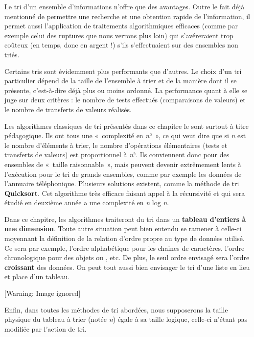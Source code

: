 {
Le tri d’un ensemble d’informations n’offre que des avantages. Outre le
fait déjà mentionné de permettre une recherche et une obtention rapide
de l’information, il permet aussi l’application de traitements
algorithmiques efficaces (comme par exemple celui des ruptures que nous
verrons plus loin) qui s’avéreraient trop coûteux (en temps, donc en
argent !) s’ils s’effectuaient sur des ensembles non triés.}

{
Certains tris sont évidemment plus performants que d’autres. Le choix
d’un tri particulier dépend de la taille de l’ensemble à trier et de la
manière dont il se présente, c’est-à-dire déjà plus ou moins ordonné.
La performance quant à elle se juge sur deux critères : le nombre de
tests effectués (comparaisons de valeurs) et le nombre de transferts de
valeurs réalisés. }

{
Les algorithmes classiques de tri présentés dans ce chapitre le sont
surtout à titre pédagogique. Ils ont tous une «~complexité en
\textit{n}²~», ce qui veut dire que si \textit{n} est le nombre
d’éléments à trier, le nombre d’opérations élémentaires (tests et
transferts de valeurs) est proportionnel à \textit{n}². Ils conviennent
donc pour des ensembles de «~taille raisonnable~», mais peuvent devenir
extrêmement lents à l’exécution pour le tri de grands ensembles, comme
par exemple les données de l’annuaire téléphonique. Plusieurs solutions
existent, comme la méthode de tri \textbf{Quicksort}. Cet algorithme
très efficace faisant appel à la récursivité et qui sera étudié en
deuxième année a une complexité en \textit{n} log \textit{n}. }

{
Dans ce chapitre, les algorithmes traiteront du tri dans un
\textbf{tableau d’entiers à une }\textbf{dimension}. Toute autre
situation peut bien entendu se ramener à celle-ci moyennant la
définition de la relation d’ordre propre au type de données utilisé. Ce
sera par exemple, l’ordre alphabétique pour les chaines de caractères,
l’ordre chronologique pour des objets  ou
, etc. De plus, le seul ordre envisagé sera l’ordre
\textbf{croissant} des données. On peut tout aussi bien envisager le
tri d’une liste en lieu et place d’un tableau.}

\begin{center}
 [Warning: Image ignored] %

\end{center}
{
Enfin, dans toutes les méthodes de tri abordées, nous supposerons la
taille physique du tableau à trier (notée \textit{n}) égale à sa taille
logique, celle-ci n’étant pas modifiée par l’action de tri.}

